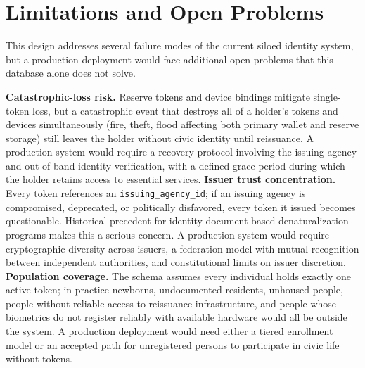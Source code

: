\documentclass[11pt,letterpaper]{article}
\begin{document}
\section{Limitations and Open Problems}
\label{sec:limitations}

This design addresses several failure modes of the current siloed identity system, but a production deployment would face additional open problems that this database alone does not solve.

\textbf{Catastrophic-loss risk.} Reserve tokens and device bindings mitigate single-token loss, but a catastrophic event that destroys all of a holder's tokens and devices simultaneously (fire, theft, flood affecting both primary wallet and reserve storage) still leaves the holder without civic identity until reissuance. A production system would require a recovery protocol involving the issuing agency and out-of-band identity verification, with a defined grace period during which the holder retains access to essential services. \textbf{Issuer trust concentration.} Every token references an \texttt{issuing\_agency\_id}; if an issuing agency is compromised, deprecated, or politically disfavored, every token it issued becomes questionable. Historical precedent for identity-document-based denaturalization programs makes this a serious concern. A production system would require cryptographic diversity across issuers, a federation model with mutual recognition between independent authorities, and constitutional limits on issuer discretion. \textbf{Population coverage.} The schema assumes every individual holds exactly one active token; in practice newborns, undocumented residents, unhoused people, people without reliable access to reissuance infrastructure, and people whose biometrics do not register reliably with available hardware would all be outside the system. A production deployment would need either a tiered enrollment model or an accepted path for unregistered persons to participate in civic life without tokens.
\end{document}
